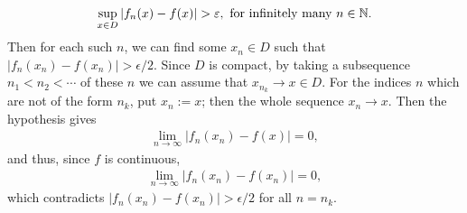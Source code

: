 \begin{problem}
\begin{solution}
\begin{itemize}
    \begin{align*}
        \sup_{x \in D} |f_n(x) - f(x)| > \varepsilon, \text{ for infinitely many } n \in \mathbb{N}.
    \end{align*}
    Then for each such $n$, we can find some $x_n \in D$ such that $|f_n(x_n) - f(x_n)| > \epsilon/2$. Since $D$ is compact, by taking a subsequence $n_1<n_2<\cdots$ of these $n$ we can assume that $x_{n_k} \to x \in D$. For the indices $n$ which are not of the form $n_k$, put $x_n := x$; then the whole sequence $x_n \to x$. Then the hypothesis gives
    \begin{align*}
        \lim_{n \to \infty}|f_n(x_n) - f(x)| = 0,
    \end{align*}
    and thus, since $f$ is continuous, \begin{align*} \lim_{n \to \infty}|f_n(x_n) - f(x_n)| = 0,
    \end{align*}
    which contradicts $|f_n(x_n) - f(x_n)| > \epsilon/2$ for all $n = n_k$.
\end{itemize}
\end{solution}
\end{problem}

